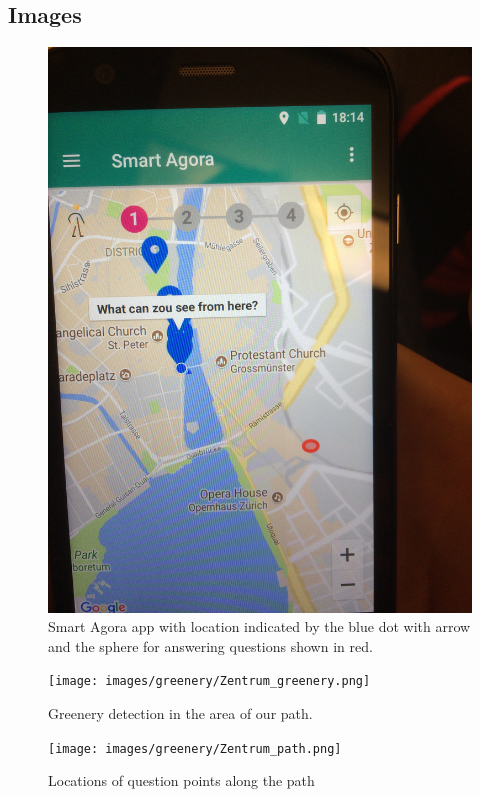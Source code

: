 \documentclass[letterpaper]{article}
\begin{document}

\subsection{Images}
\begin{figure}[htb]
    \centering
    \includegraphics[width=\columnwidth, rotate=270]{images/SmartAgora/img_6.jpg}
    \caption{Smart Agora app with location indicated by the blue dot with arrow and the sphere for answering questions shown in red.}
    \label{fig:smart_agora_1}
\end{figure}

\begin{figure}[htb]
    \centering
    \texttt{[image: images/greenery/Zentrum\_greenery.png]}
    \caption{Greenery detection in the area of our path.}
    \label{fig:path_greenery}
\end{figure}

\begin{figure}[htb]
	\centering
	\texttt{[image: images/greenery/Zentrum\_path.png]}
	\caption{Locations of question points along the path}
	\label{fig:path_points}
\end{figure}
\end{document}
